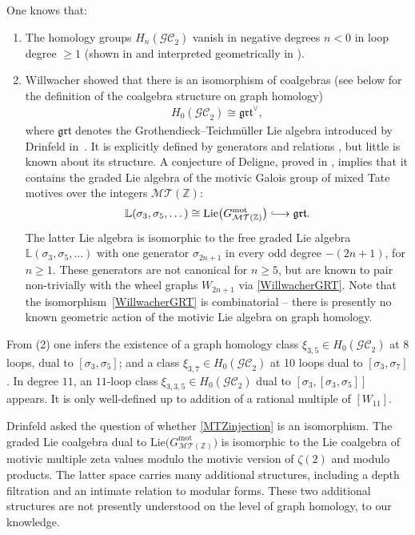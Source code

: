 \documentclass[pdftex]{sigma}%
\numberwithin{equation}{section}
\newcommand*{\Longhookrightarrow}{\ensuremath{\lhook\joinrel\relbar\joinrel\rightarrow}}
\newcommand{\Z}{\mathbb Z}
\newcommand{\GC}{\mathcal{GC}}
\newcommand{\0}{\color{blue}{\mathsf{0}}}
\begin{document}
One knows that:
\begin{enumerate}\itemsep=0pt
\item The homology groups $H_n(\GC_2)$ vanish in negative degrees $n<0$ in loop degree $\geq 1$ (shown in \cite{WillwacherGRT} and interpreted geometrically in \cite{CGP}).

\item Willwacher showed \cite{WillwacherGRT} that there is an isomorphism of coalgebras (see below for the definition of the coalgebra structure on graph homology)
\begin{gather} \label{WillwacherGRT} H_0(\GC_2) \cong \mathfrak{grt}^{\vee},
\end{gather}
where $\mathfrak{grt}$ denotes the Grothendieck--Teichm\"uller Lie algebra introduced by Drinfeld in~\cite{Drinfeld}.
It is explicitly defined by generators and relations \cite{Furusho}, but little is known about its structure. A conjecture of Deligne, proved in \cite{BrMTZ}, implies that it contains the graded Lie algebra of the motivic Galois group of mixed Tate motives over the integers
$\mathcal{MT}(\Z)$:
\begin{gather} \label{MTZinjection}
\mathbb{L} (\sigma_3, \sigma_5, \dots ) \cong \mathrm{Lie} \big(G^{\mathrm{mot}}_{\mathcal{MT}(\Z)}\big) \Longhookrightarrow \mathfrak{grt}.
\end{gather}
The latter Lie algebra is isomorphic to the free graded Lie algebra $\mathbb{L} (\sigma_3, \sigma_5, \dots )$ with one generator $\sigma_{2n+1}$ in every odd degree $-(2n+1)$, for $n\geq 1$. These generators are not canonical for $n\geq 5$, but are known to pair non-trivially with the wheel graphs $W_{2n+1}$ via \eqref{WillwacherGRT}. Note that the isomorphism~\eqref{WillwacherGRT} is combinatorial -- there is presently no known geometric action of the motivic Lie algebra on graph homology.
\end{enumerate}
From (2) one infers the existence of a graph homology class $\xi_{3,5} \in H_0(\GC_2)$ at $8$ loops, dual to $[\sigma_3, \sigma_5]$; and a class
$\xi_{3,7} \in H_0(\GC_2)$ at 10 loops dual to $[\sigma_{3},\sigma_{7}]$. In degree $11$, an $11$-loop class $\xi_{3,3,5}\in H_0(\GC_2)$ dual to $[\sigma_3, [\sigma_3, \sigma_5]]$ appears. It is only well-defined up to addition of a rational multiple of $[W_{11}]$.

\begin{rem} %
Drinfeld asked the question of whether \eqref{MTZinjection} is an isomorphism. The graded Lie coalgebra dual to $ \mathrm{Lie} \big(G^{\mathrm{mot}}_{\mathcal{MT}(\Z)}\big)$ is isomorphic to the Lie coalgebra of motivic multiple zeta values modulo the motivic version of $\zeta(2)$ and modulo products. The latter space carries many additional structures, including a depth filtration and an intimate relation to modular forms. These two additional structures are not presently understood on the level of graph homology, to our knowledge.
\end{rem}
\end{document}
